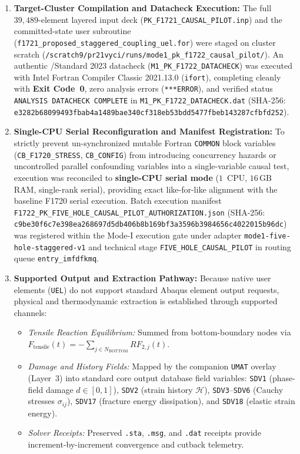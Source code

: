 \begin{enumerate}
  \item \textbf{Target-Cluster Compilation and Datacheck Execution:}
  The full $39{,}489$-element layered input deck (\texttt{PK\_F1721\_CAUSAL\_PILOT.inp}) and the committed-state user subroutine (\texttt{f1721\_proposed\_staggered\_coupling\_uel.for}) were staged on cluster scratch (\texttt{/scratch9/pr21vyci/runs/mode1\_pk\_f1722\_causal\_pilot/}). An authentic \Abaqus/Standard 2023 datacheck (\texttt{M1\_PK\_F1722\_DATACHECK}) was executed with Intel Fortran Compiler Classic 2021.13.0 (\texttt{ifort}), completing cleanly with \textbf{Exit Code~0}, zero analysis errors (\texttt{***ERROR}), and verified status \texttt{ANALYSIS DATACHECK COMPLETE} in \texttt{M1\_PK\_F1722\_DATACHECK.dat} (SHA-256: \texttt{e3282b68099493fbab4a1489bae340cf318eb53bdd5477fbeb143287cfbfd252}).
  
  \item \textbf{Single-CPU Serial Reconfiguration and Manifest Registration:}
  To strictly prevent un-synchronized mutable Fortran \texttt{COMMON} block variables (\texttt{CB\_F1720\_STRESS}, \texttt{CB\_CONFIG}) from introducing concurrency hazards or uncontrolled parallel confounding variables into a single-variable causal test, execution was reconciled to \textbf{single-CPU serial mode} ($1$~CPU, $16\,\mathrm{GB}$ RAM, single-rank serial), providing exact like-for-like alignment with the baseline F1720 serial execution. Batch execution manifest \texttt{F1722\_PK\_FIVE\_HOLE\_CAUSAL\_PILOT\_AUTHORIZATION.json} (SHA-256: \texttt{c9be30f6c7e398ea268697d5db406b8b169bf3a3596b3984656c4022015b96dc}) was registered within the Mode-I execution gate under adapter \texttt{mode1-five-hole-staggered-v1} and technical stage \texttt{FIVE\_HOLE\_CAUSAL\_PILOT} in routing queue \texttt{entry\_imfdfkmq}.

  \item \textbf{Supported Output and Extraction Pathway:}
  Because native user elements (\texttt{UEL}) do not support standard Abaqus element output requests, physical and thermodynamic extraction is established through supported channels:
  \begin{itemize}
    \item \emph{Tensile Reaction Equilibrium:} Summed from bottom-boundary nodes via $F_{\mathrm{tensile}}(t) = -\sum_{j \in N_{\mathrm{BOTTOM}}} RF_{2,j}(t)$.
    \item \emph{Damage and History Fields:} Mapped by the companion \texttt{UMAT} overlay (Layer~3) into standard \Abaqus core output database field variables: \texttt{SDV1} (phase-field damage $d \in [0, 1]$), \texttt{SDV2} (strain history $\mathcal{H}$), \texttt{SDV3}--\texttt{SDV6} (Cauchy stresses $\sigma_{ij}$), \texttt{SDV17} (fracture energy dissipation), and \texttt{SDV18} (elastic strain energy).
    \item \emph{Solver Receipts:} Preserved \texttt{.sta}, \texttt{.msg}, and \texttt{.dat} receipts provide increment-by-increment convergence and cutback telemetry.
  \end{itemize}


\end{enumerate}
